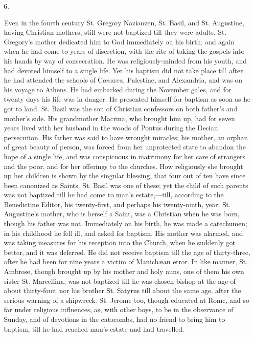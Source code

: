 6.

Even in the fourth century St. Gregory Nazianzen, St.
Basil, and St. Augustine, having Christian mothers, still
were not baptized till they were adults. St. Gregory's
mother dedicated him to God immediately on his birth; and
again when he had come to years of discretion, with the
rite of taking the gospels into his hands by way of
consecration. He was religiously-minded from his youth,
and had devoted himself to a single life. Yet his baptism
did not take place till after he had attended the schools
of Cæsarea, Palestine, and Alexandria, and was on his
voyage to Athens. He had embarked during the November
gales, and for twenty days his life was in danger. He
presented himself for baptism as soon as he got to land.
St. Basil was the son of Christian confessors on both
father's and mother's side. His grandmother Macrina, who
brought him up, had for seven years lived with her
husband in the woods of Pontus during the Decian
persecution. His father was said to have wrought
miracles; his mother, an orphan of great beauty of
person, was forced from her unprotected state to abandon
the hope of a single life, and was conspicuous in
matrimony for her care of strangers and the poor, and for
her offerings to the churches. How religiously she
brought up her children is shown by the singular
blessing, that four out of ten have since been canonized
as Saints. St. Basil was one of these; yet the child of
such parents was not baptized till he had come to man's
estate,—till, according to the Benedictine Editor,
his twenty-first, and perhaps his twenty-ninth, year. St.
Augustine's mother, who is herself a Saint, was a
Christian when he was born, though his father was not.
Immediately on his birth, he was made a catechumen; in
his childhood he fell ill, and asked for baptism. His
mother was alarmed, and was taking measures for his
reception into the Church, when he suddenly got better,
and it was deferred. He did not receive baptism till the
age of thirty-three, after he had been for nine years a
victim of Manichæan error. In like manner, St. Ambrose,
though brought up by his mother and holy nuns, one of
them his own sister St. Marcellina, was not baptized till
he was chosen bishop at the age of about thirty-four, nor
his brother St. Satyrus till about the same age, after
the serious warning of a shipwreck. St. Jerome too,
though educated at Rome, and so far under religious
influences, as, with other boys, to be in the observance
of Sunday, and of devotions in the catacombs, had no
friend to bring him to baptism, till he had reached man's
estate and had travelled.


